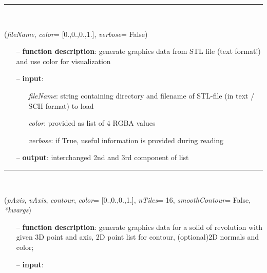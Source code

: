 \begin{itemize}[leftmargin=1.4cm]
\begin{itemize}[leftmargin=0.5cm]
\begin{itemize}[leftmargin=1.4cm]
\begin{itemize}[leftmargin=0.5cm]
\begin{itemize}[leftmargin=1.4cm]
\begin{itemize}[leftmargin=0.5cm]
%
\noindent\rule{8cm}{0.75pt}\vspace{1pt} \\ 
\begin{flushleft}
\label{sec:graphicsDataUtilities:GraphicsDataFromSTLfileTxt}
({\it fileName}, {\it color}= [0.,0.,0.,1.], {\it verbose}= False)
\end{flushleft}
\setlength{\itemindent}{0.7cm}
\begin{itemize}[leftmargin=0.7cm]
  \item[--]  {\bf function description}: generate graphics data from STL file (text format!) and use color for visualization  \item[--]  {\bf input}: \vspace{-6pt}
  \begin{itemize}[leftmargin=1.2cm]
\setlength{\itemindent}{-0.7cm}
    \item[] {\it fileName}: string containing directory and filename of STL-file (in text / SCII format) to load
    \item[] {\it   color}: provided as list of 4 RGBA values
    \item[] {\it   verbose}: if True, useful information is provided during reading
  \end{itemize}
  \item[--]  {\bf output}: interchanged 2nd and 3rd component of list\vspace{12pt}\end{itemize}
%
\noindent\rule{8cm}{0.75pt}\vspace{1pt} \\ 
\begin{flushleft}
\label{sec:graphicsDataUtilities:GraphicsDataSolidOfRevolution}
({\it pAxis}, {\it vAxis}, {\it contour}, {\it color}= [0.,0.,0.,1.], {\it nTiles}= 16, {\it smoothContour}= False, {\it **kwargs})
\end{flushleft}
\setlength{\itemindent}{0.7cm}
\begin{itemize}[leftmargin=0.7cm]
  \item[--]  {\bf function description}: generate graphics data for a solid of revolution with given 3D point and axis, 2D point list for contour, (optional)2D normals and color;  \item[--]  {\bf input}: \vspace{-6pt}

\end{itemize}
\end{itemize}
\end{itemize}
\end{itemize}
\end{itemize}
\end{itemize}
\end{itemize}
